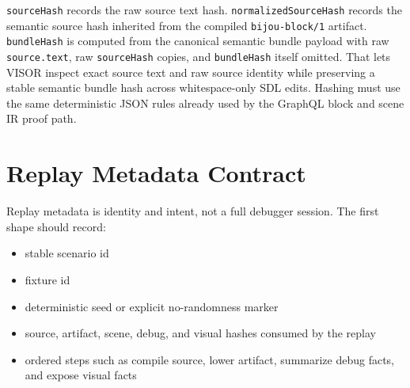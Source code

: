 \texttt{s\allowbreak{}o\allowbreak{}u\allowbreak{}r\allowbreak{}c\allowbreak{}e\allowbreak{}H\allowbreak{}a\allowbreak{}s\allowbreak{}h} records the raw source text hash. \texttt{n\allowbreak{}o\allowbreak{}r\allowbreak{}m\allowbreak{}a\allowbreak{}l\allowbreak{}i\allowbreak{}z\allowbreak{}e\allowbreak{}d\allowbreak{}S\allowbreak{}o\allowbreak{}u\allowbreak{}r\allowbreak{}c\allowbreak{}e\allowbreak{}H\allowbreak{}a\allowbreak{}s\allowbreak{}h} records the semantic source hash inherited from the compiled \texttt{b\allowbreak{}i\allowbreak{}j\allowbreak{}o\allowbreak{}u\allowbreak{}-\allowbreak{}b\allowbreak{}l\allowbreak{}o\allowbreak{}c\allowbreak{}k\allowbreak{}/\allowbreak{}1} artifact. \texttt{b\allowbreak{}u\allowbreak{}n\allowbreak{}d\allowbreak{}l\allowbreak{}e\allowbreak{}H\allowbreak{}a\allowbreak{}s\allowbreak{}h} is computed from the canonical semantic bundle payload with raw \texttt{s\allowbreak{}o\allowbreak{}u\allowbreak{}r\allowbreak{}c\allowbreak{}e\allowbreak{}.\allowbreak{}t\allowbreak{}e\allowbreak{}x\allowbreak{}t}, raw \texttt{s\allowbreak{}o\allowbreak{}u\allowbreak{}r\allowbreak{}c\allowbreak{}e\allowbreak{}H\allowbreak{}a\allowbreak{}s\allowbreak{}h} copies, and \texttt{b\allowbreak{}u\allowbreak{}n\allowbreak{}d\allowbreak{}l\allowbreak{}e\allowbreak{}H\allowbreak{}a\allowbreak{}s\allowbreak{}h} itself omitted. That lets VISOR inspect exact source text and raw source identity while preserving a stable semantic bundle hash across whitespace-only SDL edits. Hashing must use the same deterministic JSON rules already used by the GraphQL block and scene IR proof path.

\section{Replay Metadata Contract}\label{record-145-replay-metadata-contract}

Replay metadata is identity and intent, not a full debugger session. The first shape should record:

\begin{itemize}
\tightlist
\item
  stable scenario id
\item
  fixture id
\item
  deterministic seed or explicit no-randomness marker
\item
  source, artifact, scene, debug, and visual hashes consumed by the replay
\item
  ordered steps such as compile source, lower artifact, summarize debug facts, and expose visual facts
\end{itemize}

